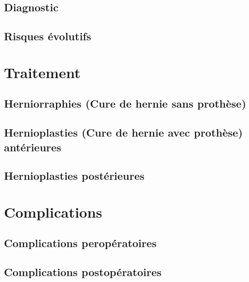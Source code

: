 \documentclass[frenc,10pt,a4paper]{article}
\begin{document}
{\label{837999}}\par\null

\subsection{Diagnostic}

{\label{932539}}

\subsection{Risques évolutifs}

{\label{116492}}

\section{Traitement}

{\label{853691}}\par\null

\subsection{Herniorraphies (Cure de hernie sans
prothèse)}

{\label{264568}}

\subsection{Hernioplasties (Cure de hernie avec prothèse)
antérieures}

{\label{192648}}

\subsection{Hernioplasties
postérieures}

{\label{502868}}

\section{Complications}

{\label{868729}}\par\null

\subsection{Complications
peropératoires}

{\label{693528}}

\subsection{Complications
postopératoires}
\end{document}
